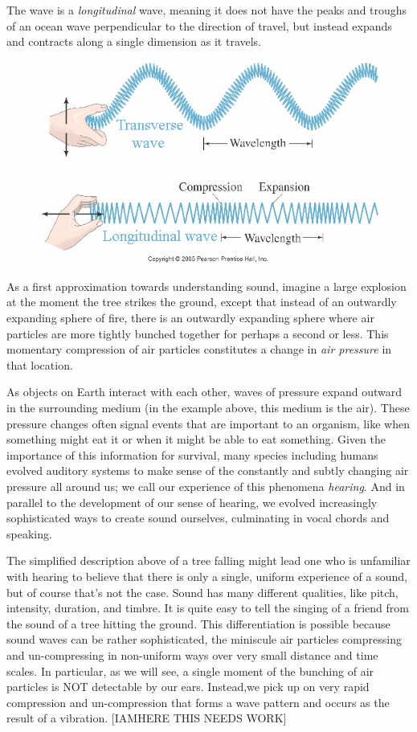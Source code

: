 \documentclass[UTF8]{book}
\begin{document}
\begin{CJK}{UTF8}{gbsn}
The wave is a \emph{longitudinal} wave, meaning it does not have the peaks and troughs of an ocean wave perpendicular to the direction of travel, but instead expands and contracts along a single dimension as it travels.

\begin{figure}[H]
\centering
\includegraphics[width=0.8\linewidth]{longvstransvwave}
\end{figure}

As a first approximation towards understanding sound, imagine a large explosion at the moment the tree strikes the ground, except that instead of an outwardly expanding sphere of fire, there is an outwardly expanding sphere where air particles are more tightly bunched together for perhaps a second or less. This momentary compression of air particles constitutes a change in \emph{air pressure} in that location.

As objects on Earth interact with each other, waves of pressure expand outward in the surrounding medium (in the example above, this medium is the air). These pressure changes often signal events that are important to an organism, like when something might eat it or when it might be able to eat something. Given the importance of this information for survival, many species including humans evolved auditory systems to make sense of the constantly and subtly changing air pressure all around us; we call our experience of this phenomena \emph{hearing}. And in parallel to the development of our sense of hearing, we evolved increasingly sophisticated ways to create sound ourselves, culminating in vocal chords and speaking.

The simplified description above of a tree falling might lead one who is unfamiliar with hearing to believe that there is only a single, uniform experience of a sound, but of course that's not the case. Sound has many different qualities, like pitch, intensity, duration, and timbre. It is quite easy to tell the singing of a friend from the sound of a tree hitting the ground. This differentiation is possible because sound waves can be rather sophisticated, the miniscule air particles compressing and un-compressing in non-uniform ways over very small distance and time scales. In particular, as we will see, a single moment of the bunching of air particles is NOT detectable by our ears. Instead,we pick up on very rapid compression and un-compression that forms a wave pattern and occurs as the result of a vibration. [IAMHERE THIS NEEDS WORK]


\end{CJK}
\end{document}
